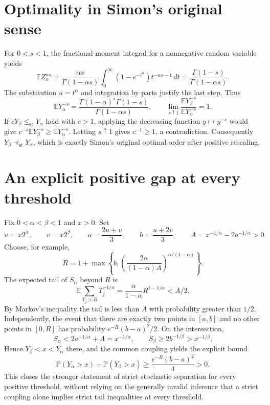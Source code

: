 \documentclass[11pt,a4paper]{article}
\begin{document}
\section{Optimality in Simon's original sense}
For $0<s<1$, the fractional-moment integral for a nonnegative random
variable yields
\[
 \mathbb E Z_\alpha^{\alpha s}
 =\frac{\alpha s}{\Gamma(1-\alpha s)}
   \int_0^\infty(1-e^{-t^\alpha})t^{-\alpha s-1}\,dt
 =\frac{\Gamma(1-s)}{\Gamma(1-\alpha s)}.
\]
The substitution $u=t^\alpha$ and integration by parts justify the
last step. Thus
\[
 \mathbb E Y_\alpha^{-s}
 =\frac{\Gamma(1-\alpha)^s\Gamma(1-s)}{\Gamma(1-\alpha s)},
 \qquad
 \lim_{s\uparrow1}
  \frac{\mathbb E Y_\beta^{-s}}{\mathbb E Y_\alpha^{-s}}=1.
\]
If $cY_\beta\leq_{\mathrm{st}}Y_\alpha$ held with $c>1$, applying
the decreasing function $y\mapsto y^{-s}$ would give
$c^{-s}\mathbb E Y_\beta^{-s}\geq\mathbb E Y_\alpha^{-s}$.
Letting $s\uparrow1$ gives $c^{-1}\geq1$, a contradiction.
Consequently $Y_\beta\prec_{\mathrm{st}}Y_\alpha$, which is exactly
Simon's original optimal order after positive rescaling.

\section{An explicit positive gap at every threshold}\label{sec:twopoint}
Fix $0<\alpha<\beta<1$ and $x>0$. Set
\[
 u=x2^\alpha,\qquad v=x2^\beta,\qquad
 a=\frac{2u+v}{3},\qquad b=\frac{u+2v}{3},\qquad
 A=x^{-1/\alpha}-2a^{-1/\alpha}>0.
\]
Choose, for example,
\[
 R=1+\max\left\{b,
      \left(\frac{2\alpha}{(1-\alpha)A}\right)^{\alpha/(1-\alpha)}
              \right\}.
\]
The expected tail of $S_\alpha$ beyond $R$ is
\[
 \mathbb E\sum_{T_j>R}T_j^{-1/\alpha}
       =\frac{\alpha}{1-\alpha}R^{1-1/\alpha}<A/2.
\]
By Markov's inequality the tail is less than $A$ with probability
greater than $1/2$. Independently, the event that there are exactly two
points in $[a,b]$ and no other points in $[0,R]$ has probability
$e^{-R}(b-a)^2/2$. On the intersection,
\[
 S_\alpha<2a^{-1/\alpha}+A=x^{-1/\alpha},\qquad
 S_\beta\geq2b^{-1/\beta}>x^{-1/\beta}.
\]
Hence $Y_\beta<x<Y_\alpha$ there, and the common coupling yields the
explicit bound
\[
 \mathbb P(Y_\alpha>x)-\mathbb P(Y_\beta>x)
       \geq\frac{e^{-R}(b-a)^2}{4}>0.
\]
This closes the stronger statement of strict stochastic separation for
every positive threshold, without relying on the generally invalid
inference that a strict coupling alone implies strict tail inequalities
at every threshold.
\end{document}
